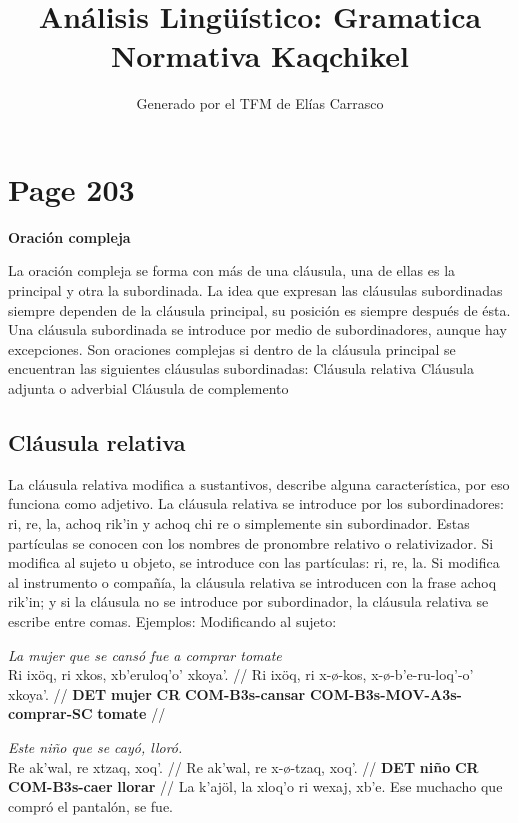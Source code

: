 \documentclass{article}%
\title{Análisis Lingüístico: Gramatica Normativa Kaqchikel}%
\author{Generado por el TFM de Elías Carrasco}%
\begin{document}
%
\normalsize%
\maketitle%
\section{Page 203}%
\label{sec:Page203}%
\centerline{\textbf{Oración compleja}}%
La oración compleja se forma con más de una cláusula, una de ellas es la principal y otra la subordinada. La idea que expresan las cláusulas subordinadas siempre dependen de la cláusula principal, su posición es siempre después de ésta. Una cláusula subordinada se introduce por medio de subordinadores, aunque hay excepciones. Son oraciones complejas si dentro de la cláusula principal se encuentran las siguientes cláusulas subordinadas: %
Cláusula relativa %
Cláusula adjunta o adverbial %
Cláusula de complemento %
\subsection{Cláusula relativa}%
\label{subsec:Clusularelativa}%

%
La cláusula relativa modifica a sustantivos, describe alguna característica, por eso funciona como adjetivo. La cláusula relativa se introduce por los subordinadores: ri, re, la, achoq rik'in y achoq chi re o simplemente sin subordinador. Estas partículas se conocen con los nombres de pronombre relativo o relativizador. Si modifica al sujeto u objeto, se introduce con las partículas: ri, re, la. Si modifica al instrumento o compañía, la cláusula relativa se introducen con la frase achoq rik'in; y si la cláusula no se introduce por subordinador, la cláusula relativa se escribe entre comas. Ejemplos: %
Modificando al sujeto: %
\par\medskip%
\ex
\textit{La mujer que se cansó fue a comprar tomate} \\
\begingl
\gla Ri ixöq, ri xkos, xb'eruloq'o' xkoya'. //
\glb Ri ixöq, ri x-ø-kos, x-ø-b'e-ru-loq'-o' xkoya'. //
\glc \textbf{DET} \textbf{mujer} \textbf{CR} \textbf{COM-B3s-cansar} \textbf{COM-B3s-MOV-A3s-comprar-SC} \textbf{tomate} //
\endgl
\xe
%
\medskip%
\par\medskip%
\ex
\textit{Este niño que se cayó, lloró.} \\
\begingl
\gla Re ak'wal, re xtzaq, xoq'. //
\glb Re ak'wal, re x-ø-tzaq, xoq'. //
\glc \textbf{DET} \textbf{niño} \textbf{CR} \textbf{COM-B3s-caer} \textbf{llorar} //
\endgl
\xe
%
\medskip%
La k'ajöl, la xloq'o ri wexaj, xb'e. %
Ese muchacho que compró el pantalón, se fue. 

%
\end{document}
